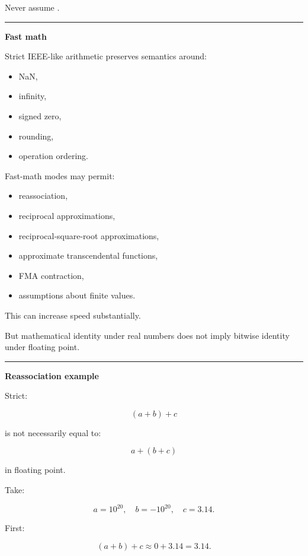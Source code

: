 Never assume .

\begin{center}\rule{0.5\linewidth}{0.5pt}\end{center}

\textbf{Fast math}

Strict IEEE-like arithmetic preserves semantics around:

\begin{itemize}
\tightlist
\item
  NaN,
\item
  infinity,
\item
  signed zero,
\item
  rounding,
\item
  operation ordering.
\end{itemize}

Fast-math modes may permit:

\begin{itemize}
\tightlist
\item
  reassociation,
\item
  reciprocal approximations,
\item
  reciprocal-square-root approximations,
\item
  approximate transcendental functions,
\item
  FMA contraction,
\item
  assumptions about finite values.
\end{itemize}

This can increase speed substantially.

But mathematical identity under real numbers does not imply bitwise identity under floating point.

\begin{center}\rule{0.5\linewidth}{0.5pt}\end{center}

\textbf{Reassociation example}

Strict:

\[
(a+b)+c
\]

is not necessarily equal to:

\[
a+(b+c)
\]

in floating point.

Take:

\[
a=10^{20},
\quad
b=-10^{20},
\quad
c=3.14.
\]

First:

\[
(a+b)+c
\approx
0+3.14
=
3.14.
\]

